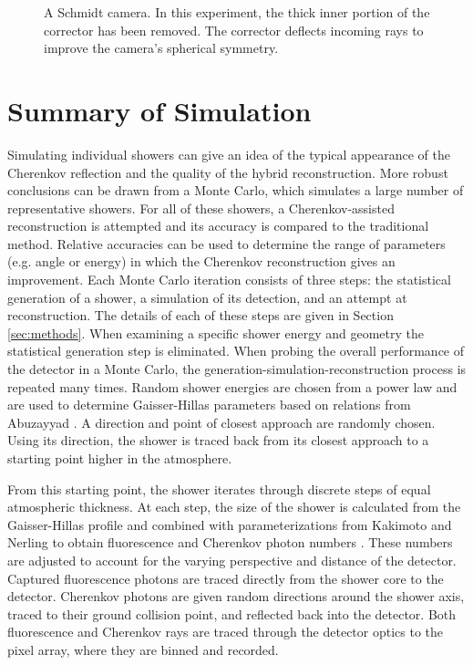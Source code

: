 \begin{figure}[!ht]
    \label{fig:schmidt}
    \centering
    \caption{A Schmidt camera. In this experiment, the thick inner portion of the corrector has been removed. The corrector deflects incoming rays to improve the camera's spherical symmetry.}
\end{figure}

\section{Summary of Simulation} \label{sec:sim_summary}

Simulating individual showers can give an idea of the typical appearance of the Cherenkov reflection and the quality of the hybrid reconstruction. More robust conclusions can be drawn from a Monte Carlo, which simulates a large number of representative showers. For all of these showers, a Cherenkov-assisted reconstruction is attempted and its accuracy is compared to the traditional method. Relative accuracies can be used to determine the range of parameters (e.g. angle or energy) in which the Cherenkov reconstruction gives an improvement. Each Monte Carlo iteration consists of three steps: the statistical generation of a shower, a simulation of its detection, and an attempt at reconstruction. The details of each of these steps are given in Section \ref{sec:methods}. When examining a specific shower energy and geometry the statistical generation step is eliminated. When probing the overall performance of the detector in a Monte Carlo, the generation-simulation-reconstruction process is repeated many times. Random shower energies are chosen from a power law and are used to determine Gaisser-Hillas parameters based on relations from Abuzayyad \cite{abuzayyad2000hires}. A direction and point of closest approach are randomly chosen. Using its direction, the shower is traced back from its closest approach to a starting point higher in the atmosphere.

From this starting point, the shower iterates through discrete steps of equal atmospheric thickness. At each step, the size of the shower is calculated from the Gaisser-Hillas profile and combined with parameterizations from Kakimoto and Nerling to obtain fluorescence and Cherenkov photon numbers \cite{gaisser1977profile,kakimoto1996yield,nerling2006electron}. These numbers are adjusted to account for the varying perspective and distance of the detector. Captured fluorescence photons are traced directly from the shower core to the detector. Cherenkov photons are given random directions around the shower axis, traced to their ground collision point, and reflected back into the detector. Both fluorescence and Cherenkov rays are traced through the detector optics to the pixel array, where they are binned and recorded.

